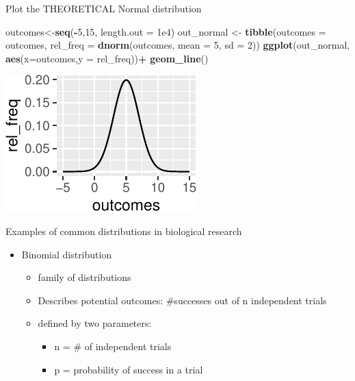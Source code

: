 \documentclass[
  12pt,
  ignorenonframetext,
  aspectratio=169,
]{beamer}
\newenvironment{Shaded}{\begin{snugshade}}{\end{snugshade}}
\newcommand{\DataTypeTok}[1]{\textcolor[rgb]{0.13,0.29,0.53}{#1}}
\newcommand{\DecValTok}[1]{\textcolor[rgb]{0.00,0.00,0.81}{#1}}
\newcommand{\FloatTok}[1]{\textcolor[rgb]{0.00,0.00,0.81}{#1}}
\newcommand{\KeywordTok}[1]{\textcolor[rgb]{0.13,0.29,0.53}{\textbf{#1}}}
\newcommand{\NormalTok}[1]{#1}
\newcommand{\OperatorTok}[1]{\textcolor[rgb]{0.81,0.36,0.00}{\textbf{#1}}}
\newcommand{\StringTok}[1]{\textcolor[rgb]{0.31,0.60,0.02}{#1}}
\providecommand{\tightlist}{%
  \setlength{\itemsep}{0pt}\setlength{\parskip}{0pt}}
\begin{document}
\begin{frame}[fragile]{Plot the THEORETICAL Normal distribution}
\protect\hypertarget{plot-the-theoretical-normal-distribution}{}

\begin{Shaded}
\begin{Highlighting}[]
\NormalTok{outcomes<-}\KeywordTok{seq}\NormalTok{(}\OperatorTok{-}\DecValTok{5}\NormalTok{,}\DecValTok{15}\NormalTok{, }\DataTypeTok{length.out =} \FloatTok{1e4}\NormalTok{)}
\NormalTok{out_normal <-}\StringTok{ }\KeywordTok{tibble}\NormalTok{(}\DataTypeTok{outcomes =}\NormalTok{ outcomes, }
                     \DataTypeTok{rel_freq =} \KeywordTok{dnorm}\NormalTok{(outcomes, }\DataTypeTok{mean =} \DecValTok{5}\NormalTok{, }\DataTypeTok{sd =} \DecValTok{2}\NormalTok{))}
\KeywordTok{ggplot}\NormalTok{(out_normal, }\KeywordTok{aes}\NormalTok{(}\DataTypeTok{x=}\NormalTok{outcomes,}\DataTypeTok{y =}\NormalTok{ rel_freq))}\OperatorTok{+}
\StringTok{   }\KeywordTok{geom_line}\NormalTok{()}
\end{Highlighting}
\end{Shaded}

\begin{center}\includegraphics{Lecture-2_files/figure-beamer/unnamed-chunk-2-1} \end{center}

\end{frame}

\begin{frame}{Examples of common distributions in biological research}
\protect\hypertarget{examples-of-common-distributions-in-biological-research-1}{}

\begin{itemize}
\tightlist
\item
  Binomial distribution

  \begin{itemize}
  \tightlist
  \item
    family of distributions
  \item
    Describes potential outcomes: \#successes out of n independent
    trials
  \item
    defined by two parameters:

    \begin{itemize}
    \tightlist
    \item
      n = \# of independent trials
    \item
      p = probability of success in a trial
    \end{itemize}
  \end{itemize}
\end{itemize}

\end{frame}
\end{document}
